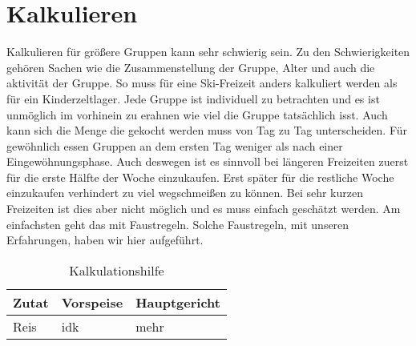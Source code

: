 \section{Kalkulieren}\label{sec:kalkulieren}
Kalkulieren für größere Gruppen kann sehr schwierig sein.
Zu den Schwierigkeiten gehören Sachen wie die Zusammenstellung der Gruppe, Alter und auch die aktivität der Gruppe.
So muss für eine Ski-Freizeit anders kalkuliert werden als für ein Kinderzeltlager.
Jede Gruppe ist individuell zu betrachten und es ist unmöglich im vorhinein zu erahnen wie viel die Gruppe tatsächlich isst.
Auch kann sich die Menge die gekocht werden muss von Tag zu Tag unterscheiden.
Für gewöhnlich essen Gruppen an dem ersten Tag weniger als nach einer Eingewöhnungsphase.
Auch deswegen ist es sinnvoll bei längeren Freizeiten zuerst für die erste Hälfte der Woche einzukaufen.
Erst später für die restliche Woche einzukaufen verhindert zu viel wegschmeißen zu können.
Bei sehr kurzen Freizeiten ist dies aber nicht möglich und es muss einfach geschätzt werden.
Am einfachsten geht das mit Faustregeln.
Solche Faustregeln, mit unseren Erfahrungen, haben wir hier aufgeführt.


\begin{table}[H]
    \centering
    \caption{Kalkulationshilfe}
    \label{tab:kalkulationshilfe}
    \begin{tabular}{lll}
        \hline
        Zutat&Vorspeise&Hauptgericht\\\hline
        Reis&idk&mehr\\\hline
    \end{tabular}
\end{table}
